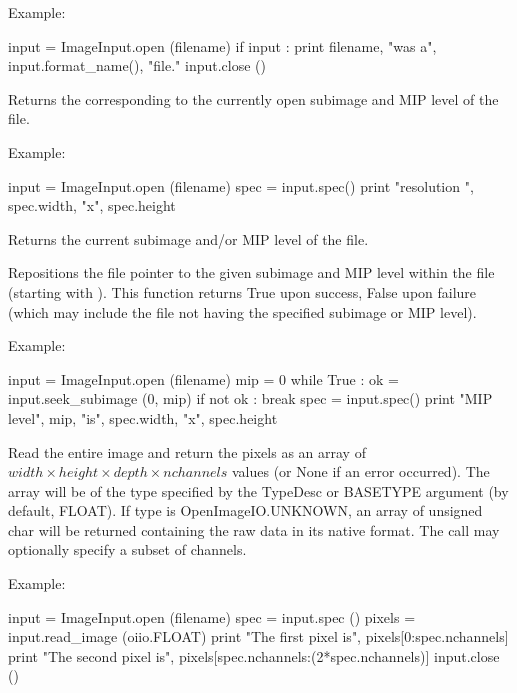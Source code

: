 \noindent Example:
\begin{code}
    input = ImageInput.open (filename)
    if input :
        print filename, "was a", input.format_name(), "file."
        input.close ()
  
\end{code}
\apiend

Returns the \ImageSpec corresponding to the currently open subimage and
MIP level of the file.

\noindent Example:
\begin{code}
    input = ImageInput.open (filename)
    spec = input.spec()
    print "resolution ", spec.width, "x", spec.height
\end{code}
\apiend

Returns the current subimage and/or MIP level of the file.
\apiend

Repositions the file pointer to the given subimage and MIP level within the
file (starting with {}).  This function returns {\cf True} upon success,
{\cf False} upon failure (which may include the file not having the
specified subimage or MIP level).

\noindent Example:
\begin{code}
    input = ImageInput.open (filename)
    mip = 0
    while True :
        ok = input.seek_subimage (0, mip)
        if not ok :
            break
        spec = input.spec()
        print "MIP level", mip, "is", spec.width, "x", spec.height
\end{code}
\apiend

Read the entire image and return the pixels as an array of
$\mathit{width} \times \mathit{height} \times \mathit{depth} \times \mathit{nchannels}$
values (or {\cf None} if an error occurred). The array will be of the type
specified by the {\cf TypeDesc} or {\cf BASETYPE} argument (by default,
{\cf FLOAT}). If {\cf type} is {\cf OpenImageIO.UNKNOWN}, an
array of {\cf unsigned char} will be returned containing the raw data in
its native format. The call may optionally specify a subset of channels.

\noindent Example:
\begin{code}
    input = ImageInput.open (filename)
    spec = input.spec ()
    pixels = input.read_image (oiio.FLOAT)
    print "The first pixel is", pixels[0:spec.nchannels]
    print "The second pixel is", pixels[spec.nchannels:(2*spec.nchannels)]
    input.close ()
\end{code}
\apiend

